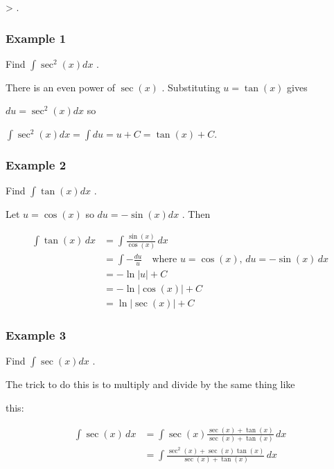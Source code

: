 >     .


\subsubsection{Example 1}
\label{sss:exam-acc3}


Find $\int\sec^2(x)dx$ .


There is an even power of $\sec(x)$ . Substituting $u=\tan(x)$ gives

$du=\sec^2(x)dx$ so


$\int\sec^2(x)dx=\int du=u+C=\tan(x)+C.$


\subsubsection{Example 2}
\label{sss:exam-5bdd}


Find $\int\tan(x)dx$ .


Let $u=\cos(x)$ so $du=-\sin(x)dx$ . Then


\begin{align}
\int\tan(x)\,dx 
&= \int\frac{\sin(x)}{\cos(x)}\,dx \\&= \int -\frac{du}{u} \quad \text{where } u = \cos(x), \, du = -\sin(x)\,dx \\&= -\ln|u| + C \\&= -\ln\Big|\cos(x)\Big| + C \\&= \ln\Big|\sec(x)\Big| + C
\end{align}


\subsubsection{Example 3}
\label{sss:exam-ad87}


Find $\int\sec(x)dx$ .


The trick to do this is to multiply and divide by the same thing like

this:


\begin{align}
\int\sec(x)\,dx 
&= \int\sec(x)\frac{\sec(x) + \tan(x)}{\sec(x) + \tan(x)}\,dx \\&= \int\frac{\sec^2(x) + \sec(x)\tan(x)}{\sec(x) + \tan(x)}\,dx
\end{align}


